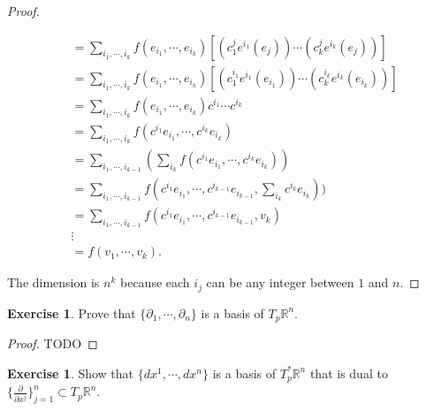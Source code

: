 \documentclass[12pt, psamsfonts]{amsart}
\theoremstyle{definition}
\newtheorem{exer}[thm]{Exercise}
\theoremstyle{remark}
\numberwithin{equation}{section}
\begin{document}
\begin{proof}
\begin{itemize}
\begin{align*}
          &= \sum_{i_1, \cdots, i_k} f(e_{i_1}, \cdots, e_{i_k})[(c^j_1e^{i_1}(e_j)) \cdots (c^j_ke^{i_k}(e_j))] \\
          &= \sum_{i_1, \cdots, i_k} f(e_{i_1}, \cdots, e_{i_k})[(c^{i_1}_1e^{i_1}(e_{i_1})) \cdots (c^{i_k}_ke^{i_k}(e_{i_k}))] \\
          &= \sum_{i_1, \cdots, i_k} f(e_{i_1}, \cdots, e_{i_k})c^{i_1} \cdots c^{i_k} \\
          &= \sum_{i_1, \cdots, i_k} f(c^{i_1}e_{i_1}, \cdots, c^{i_k}e_{i_k}) \\
          &= \sum_{i_1, \cdots, i_{k - 1}} (\sum_{i_k} f(c^{i_1}e_{i_1}, \cdots, c^{i_k}e_{i_k})) \\
          &= \sum_{i_1, \cdots, i_{k - 1}} f(c^{i_1}e_{i_1}, \cdots, c^{i_{k - 1}}e_{i_{k - 1}}, \sum_{i_k} c^{i_k}e_{i_k})) \\
          &= \sum_{i_1, \cdots, i_{k - 1}} f(c^{i_1}e_{i_1}, \cdots, c^{i_{k - 1}}e_{i_{k - 1}}, v_k) \\
          &  \vdots \\
          &= f(v_1, \cdots, v_k).
      \end{align*}
  \end{itemize}
  The dimension is $n^k$ because each $i_j$ can be any integer between $1$ and $n$.
\end{proof}

\begin{exer}
  Prove that $\{ \partial_1, \cdots, \partial_n \}$ is a basis of $T_p \mathbb{R}^n$.
\end{exer}

\begin{proof}
  TODO
\end{proof}

\begin{exer}
  Show that $\{ dx^1, \cdots, dx^n \}$ is a basis of $T_p^*\mathbb{R}^n$ that is dual to $\{ \frac{\partial}{\partial x^j} \}^n_{j = 1} \subset T_p\mathbb{R}^n$.
\end{exer}
\end{document}
